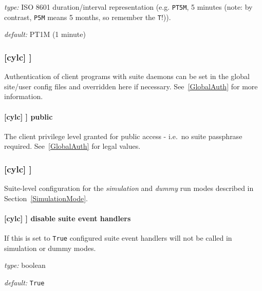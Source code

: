 \begin{myitemize}
    \item {\em type:} ISO 8601 duration/interval representation (e.g.
 \lstinline=PT5M=, 5 minutes (note: by contrast, \lstinline=P5M= means 5
 months, so remember the \lstinline=T=!)).
    \item {\em default:} PT1M (1 minute)
\end{myitemize}

\subsubsection[{[[}authentication{]]}]{[cylc] \textrightarrow [[authentication]] }
\label{SuiteAuth}

Authentication of client programs with suite daemons can be set in the
global site/user config files and overridden here if necessary.
See~\ref{GlobalAuth} for more information.

\paragraph[public]{[cylc] \textrightarrow [[authentication]] \textrightarrow public}

The client privilege level granted for public access - i.e.\ no suite passphrase
required.  See~\ref{GlobalAuth} for legal values.

\subsubsection[{[[}simulation{]]} ]{[cylc] \textrightarrow [[simulation]]}

Suite-level configuration for the {\em simulation} and {\em dummy} run modes
described in Section~\ref{SimulationMode}.

\paragraph[disable suite event handlers]{[cylc] \textrightarrow [[simulation]] \textrightarrow disable suite event handlers}

If this is set to \lstinline=True= configured suite event handlers will not be
called in simulation or dummy modes.

\begin{myitemize}
    \item {\em type:} boolean
    \item {\em default:} \lstinline=True=
\end{myitemize}

